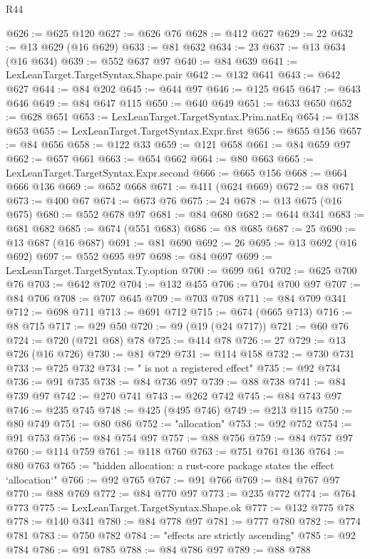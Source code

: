 \begin{lexlean}{R44}
\begin{coremodule}
@626 := @625 @120
@627 := @626 @76
@628 := @412 @627
@629 := 22
@632 := @13 @629 (@16 @629)
@633 := @81 @632
@634 := 23
@637 := @13 @634 (@16 @634)
@639 := @552 @637 @97
@640 := @84 @639
@641 := LexLeanTarget.TargetSyntax.Shape.pair
@642 := @132 @641
@643 := @642 @627
@644 := @84 @202
@645 := @644 @97
@646 := @125 @645
@647 := @643 @646
@649 := @84 @647 @115
@650 := @640 @649
@651 := @633 @650
@652 := @628 @651
@653 := LexLeanTarget.TargetSyntax.Prim.natEq
@654 := @138 @653
@655 := LexLeanTarget.TargetSyntax.Expr.first
@656 := @655 @156
@657 := @84 @656
@658 := @122 @33
@659 := @121 @658
@661 := @84 @659 @97
@662 := @657 @661
@663 := @654 @662
@664 := @80 @663
@665 := LexLeanTarget.TargetSyntax.Expr.second
@666 := @665 @156
@668 := @664 @666 @136
@669 := @652 @668
@671 := @411 (@624 @669)
@672 := @8 @671
@673 := @400 @67
@674 := @673 @76
@675 := 24
@678 := @13 @675 (@16 @675)
@680 := @552 @678 @97
@681 := @84 @680
@682 := @644 @341
@683 := @681 @682
@685 := @674 (@551 @683)
@686 := @8 @685
@687 := 25
@690 := @13 @687 (@16 @687)
@691 := @81 @690
@692 := 26
@695 := @13 @692 (@16 @692)
@697 := @552 @695 @97
@698 := @84 @697
@699 := LexLeanTarget.TargetSyntax.Ty.option
@700 := @699 @61
@702 := @625 @700 @76
@703 := @642 @702
@704 := @132 @455
@706 := @704 @700 @97
@707 := @84 @706
@708 := @707 @645
@709 := @703 @708
@711 := @84 @709 @341
@712 := @698 @711
@713 := @691 @712
@715 := @674 (@665 @713)
@716 := @8 @715
@717 := @29 @50
@720 := @9 (@19 (@24 @717))
@721 := @60 @76
@724 := @720 (@721 @68) @78
@725 := @414 @78
@726 := 27
@729 := @13 @726 (@16 @726)
@730 := @81 @729
@731 := @114 @158
@732 := @730 @731
@733 := @725 @732
@734 := " is not a registered effect"
@735 := @92 @734
@736 := @91 @735
@738 := @84 @736 @97
@739 := @88 @738
@741 := @84 @739 @97
@742 := @270 @741
@743 := @262 @742
@745 := @84 @743 @97
@746 := @235 @745
@748 := @425 (@495 @746)
@749 := @213 @115
@750 := @80 @749
@751 := @80 @86
@752 := "allocation"
@753 := @92 @752
@754 := @91 @753
@756 := @84 @754 @97
@757 := @88 @756
@759 := @84 @757 @97
@760 := @114 @759
@761 := @118 @760
@763 := @751 @761 @136
@764 := @80 @763
@765 := "hidden allocation: a rust-core package states the effect `allocation`"
@766 := @92 @765
@767 := @91 @766
@769 := @84 @767 @97
@770 := @88 @769
@772 := @84 @770 @97
@773 := @235 @772
@774 := @764 @773
@775 := LexLeanTarget.TargetSyntax.Shape.ok
@777 := @132 @775 @78
@778 := @140 @341
@780 := @84 @778 @97
@781 := @777 @780
@782 := @774 @781
@783 := @750 @782
@784 := "effects are strictly ascending"
@785 := @92 @784
@786 := @91 @785
@788 := @84 @786 @97
@789 := @88 @788

\end{coremodule}
\end{lexlean}
